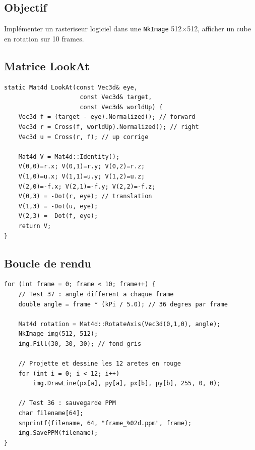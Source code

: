 \documentclass[12pt,a4paper]{report}
\begin{document}
\subsection{Objectif}

Implémenter un rasteriseur logiciel dans une \texttt{NkImage} 512$\times$512,
afficher un cube en rotation sur 10 frames.

\subsection{Matrice LookAt}

\begin{lstlisting}[caption={Mat4d --- LookAt}]
static Mat4d LookAt(const Vec3d& eye,
                     const Vec3d& target,
                     const Vec3d& worldUp) {
    Vec3d f = (target - eye).Normalized(); // forward
    Vec3d r = Cross(f, worldUp).Normalized(); // right
    Vec3d u = Cross(r, f); // up corrige

    Mat4d V = Mat4d::Identity();
    V(0,0)=r.x; V(0,1)=r.y; V(0,2)=r.z;
    V(1,0)=u.x; V(1,1)=u.y; V(1,2)=u.z;
    V(2,0)=-f.x; V(2,1)=-f.y; V(2,2)=-f.z;
    V(0,3) = -Dot(r, eye); // translation
    V(1,3) = -Dot(u, eye);
    V(2,3) =  Dot(f, eye);
    return V;
}
\end{lstlisting}

\subsection{Boucle de rendu}

\begin{lstlisting}[caption={rasterizer-lookat.cpp --- 10 frames}]
for (int frame = 0; frame < 10; frame++) {
    // Test 37 : angle different a chaque frame
    double angle = frame * (kPi / 5.0); // 36 degres par frame

    Mat4d rotation = Mat4d::RotateAxis(Vec3d(0,1,0), angle);
    NkImage img(512, 512);
    img.Fill(30, 30, 30); // fond gris

    // Projette et dessine les 12 aretes en rouge
    for (int i = 0; i < 12; i++)
        img.DrawLine(px[a], py[a], px[b], py[b], 255, 0, 0);

    // Test 36 : sauvegarde PPM
    char filename[64];
    snprintf(filename, 64, "frame_%02d.ppm", frame);
    img.SavePPM(filename);
}
\end{lstlisting}
\end{document}
